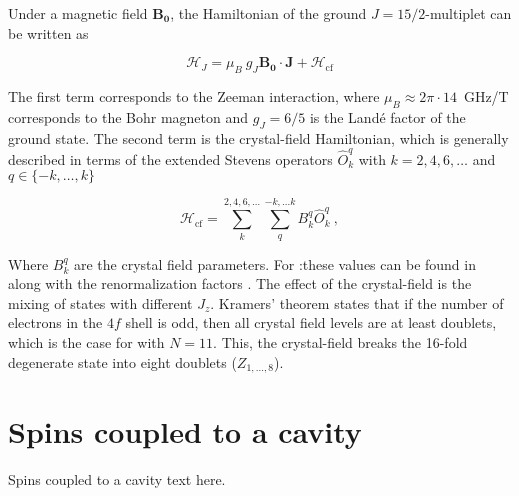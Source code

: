 
Under a magnetic field $\mathbf{B_0}$, the Hamiltonian of the ground $J=15/2$-multiplet can be written as 

\begin{equation}
    \mathcal{H}_J = \mu_B \ g_J\mathbf{B_0}\cdot \mathbf{J} + \mathcal{H}_{\mathrm{cf}}
\end{equation}

The first term corresponds to the Zeeman interaction, where $\mu_B\approx2\pi\cdot14$~GHz/T corresponds to the Bohr magneton and $g_J=6/5$ is the Landé factor of the \Er ground state. The second term is the crystal-field Hamiltonian, which is generally described in terms of the extended Stevens operators $\hat{O}^q_k$ with $k=2,4,6,\dots$ and $q \in \{-k,\dots, k\}$ \cite{abragam_electron_2012, stevens_matrix_1952}

\begin{equation}
    \mathcal{H}_{\mathrm{cf}} = \sum_{k}^{2,4,6,\dots}\sum_{q}^{-k,...k} B_k^q \hat{O}^q_k \ ,
\end{equation}

Where $B_k^q$ are the crystal field parameters. For \Er:\Ca these values can be found in \cite{enrique_optical_1971} along with the renormalization factors \cite{erath_crystal_1961}. The effect of the crystal-field is the mixing of states with different $J_z$. Kramers' theorem \cite{kramers_general_1930} states that if the number of electrons in the $4f$ shell is odd, then all crystal field levels are at least doublets, which is the case for \Er with $N=11$. This, the crystal-field breaks the 16-fold degenerate state into eight doublets ($Z_{1,\dots,8}$). 

\section{Spins coupled to a cavity}
Spins coupled to a cavity text here.